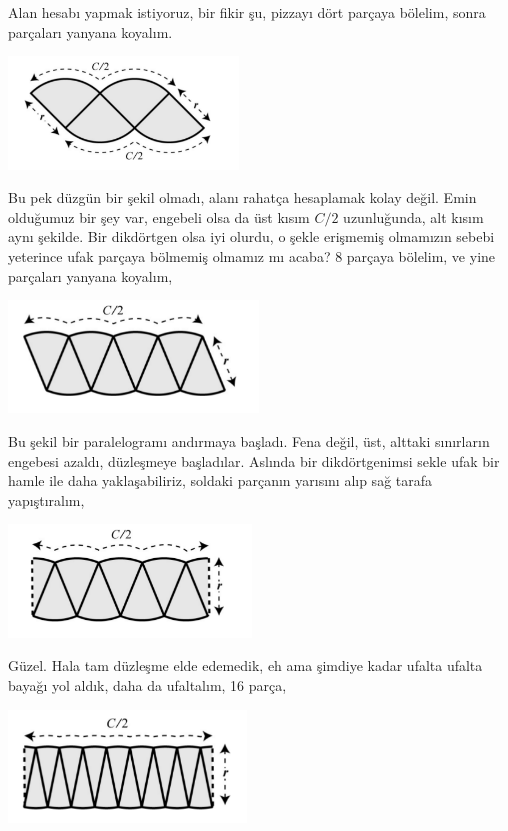 \documentclass[12pt,fleqn]{article}\usepackage{../../common}
\begin{document}
Alan hesabı yapmak istiyoruz, bir fikir şu, pizzayı dört parçaya bölelim,
sonra parçaları yanyana koyalım.

\includegraphics[height=3cm]{circ_3.png}

Bu pek düzgün bir şekil olmadı, alanı rahatça hesaplamak kolay değil. Emin
olduğumuz bir şey var, engebeli olsa da üst kısım $C/2$ uzunluğunda, alt
kısım aynı şekilde. Bir dikdörtgen olsa iyi olurdu, o şekle erişmemiş
olmamızın sebebi yeterince ufak parçaya bölmemiş olmamız mı acaba? 8
parçaya bölelim, ve yine parçaları yanyana koyalım,

\includegraphics[height=3cm]{circ_4.png}

Bu şekil bir paralelogramı andırmaya başladı. Fena değil, üst, alttaki
sınırların engebesi azaldı, düzleşmeye başladılar. Aslında bir
dikdörtgenimsi sekle ufak bir hamle ile daha yaklaşabiliriz, soldaki
parçanın yarısını alıp sağ tarafa yapıştıralım,

\includegraphics[height=3cm]{circ_5.png}

Güzel. Hala tam düzleşme elde edemedik, eh ama şimdiye kadar ufalta ufalta
bayağı yol aldık, daha da ufaltalım, 16 parça,

\includegraphics[height=3cm]{circ_6.png}
\end{document}
